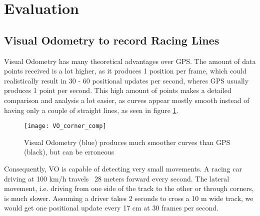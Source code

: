 \section{Evaluation}
\label{sec:evaluation}

\subsection{Visual Odometry to record Racing Lines}
Visual Odometry has many theoretical advantages over GPS. The amount of data points received is a lot higher, as it produces 1 position per frame, which could realistically result in 30 - 60 positional updates per second, wheres GPS usually produces 1 point per second. This high amount of points makes a detailed comparison and analysis a lot easier, as curves appear mostly smooth instead of having only a couple of straight lines, as seen in figure \ref{fig:vo_gps_comp}.

\begin{figure}[!ht]
	\texttt{[image: VO\_corner\_comp]}
	\caption{Visual Odometry (blue) produces much smoother curves than GPS (black), but can be erroneous}
	\label{fig:vo_gps_comp}
\end{figure}

Consequently, VO is capable of detecting very small movements. A racing car driving at 100 km/h travels ~28 meters forward every second. The lateral movement, i.e. driving from one side of the track to the other or through corners, is much slower. Assuming a driver takes 2 seconds to cross a 10 m wide track, we would get one positional update every 17 cm at 30 frames per second. 

